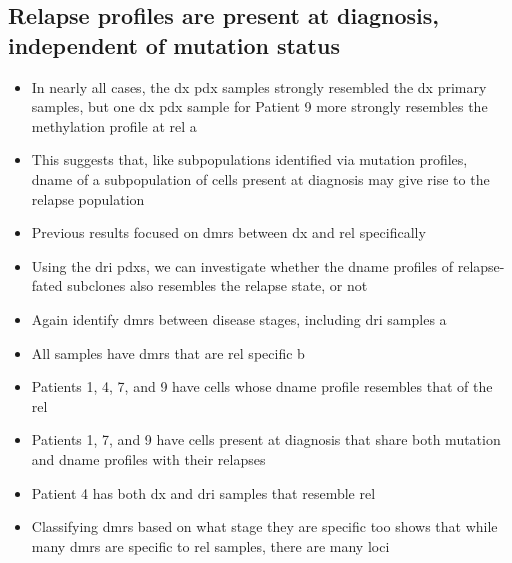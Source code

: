 
\subsection{Relapse  profiles are present at diagnosis, independent of mutation status}

\begin{itemize}
  \item In nearly all cases, the \gls{dx} \gls{pdx} samples strongly resembled the \gls{dx} primary samples, but one \gls{dx} \gls{pdx} sample for Patient 9 more strongly resembles the methylation profile at \gls{rel} a
  \item This suggests that, like subpopulations identified via mutation profiles, \gls{dname} of a subpopulation of cells present at diagnosis may give rise to the relapse population
  
\end{itemize}

\begin{itemize}
  \item Previous results focused on \glspl{dmr} between \gls{dx} and \gls{rel} specifically
  \item Using the \gls{dri} \glspl{pdx}, we can investigate whether the \gls{dname} profiles of relapse-fated subclones also resembles the relapse state, or not
  \item Again identify \glspl{dmr} between disease stages, including \gls{dri} samples a
  \item All samples have \glspl{dmr} that are \Gls{rel} specific b
  \item Patients 1, 4, 7, and 9 have cells whose \gls{dname} profile resembles that of the \gls{rel}
  \item Patients 1, 7, and 9 have cells present at diagnosis that share both mutation and \gls{dname} profiles with their relapses
  \item Patient 4 has both \gls{dx} and \gls{dri} samples that resemble \gls{rel}
  \item Classifying \glspl{dmr} based on what stage they are specific too shows that while many \glspl{dmr} are specific to \gls{rel} samples, there are many loci 
\end{itemize}

